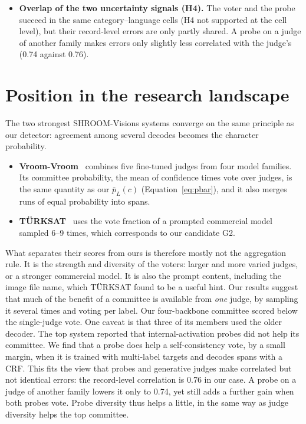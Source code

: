 \begin{itemize}
\begin{itemize}
    \end{itemize}
    Together they reach Cor+Lbl 0.4312 on test against 0.4132 for the original-data judge (three-seed means). The gain holds for every seed and language, and on validation the final detector meets the pre-registered criterion on both halves.
    \item \textbf{Overlap of the two uncertainty signals (H4).} The voter and the probe succeed in the same category--language cells (H4 not supported at the cell level), but their record-level errors are only partly shared. A probe on a judge of another family makes errors only slightly less correlated with the judge's (0.74 against 0.76).
\end{itemize}

\section{Position in the research landscape}

The two strongest SHROOM-Visions systems converge on the same principle as our detector: agreement among several decodes becomes the character probability.
\begin{itemize}
    \item \textbf{Vroom-Vroom}~\cite{vroomvroom2026} combines five fine-tuned judges from four model families. Its committee probability, the mean of confidence times vote over judges, is the same quantity as our $\bar p_L(c)$ (Equation~\ref{eq:pbar}), and it also merges runs of equal probability into spans.
    \item \textbf{TÜRKSAT}~\cite{karamanlioglu2026turksat} uses the vote fraction of a prompted commercial model sampled 6--9 times, which corresponds to our candidate G2.
\end{itemize}
What separates their scores from ours is therefore mostly not the aggregation rule. It is the strength and diversity of the voters: larger and more varied judges, or a stronger commercial model. It is also the prompt content, including the image file name, which TÜRKSAT found to be a useful hint. Our results suggest that much of the benefit of a committee is available from \emph{one} judge, by sampling it several times and voting per label. Our four-backbone committee scored below the single-judge vote. One caveat is that three of its members used the older decoder. The top system reported that internal-activation probes did not help its committee. We find that a probe does help a self-consistency vote, by a small margin, when it is trained with multi-label targets and decodes spans with a CRF. This fits the view that probes and generative judges make correlated but not identical errors: the record-level correlation is 0.76 in our case. A probe on a judge of another family lowers it only to 0.74, yet still adds a further gain when both probes vote. Probe diversity thus helps a little, in the same way as judge diversity helps the top committee.

